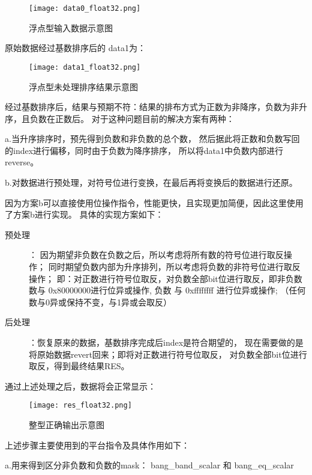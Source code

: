 \begin{figure}[ht]
    \centering
    \texttt{[image: data0\_float32.png]}
    \caption{浮点型输入数据示意图}
    \label{fig:data0}
\end{figure}


原始数据经过基数排序后的 data1为：

\begin{figure}[ht]
    \centering
    \texttt{[image: data1\_float32.png]}
    \caption{浮点型未处理排序结果示意图}
    \label{fig:data1}
\end{figure}


经过基数排序后，结果与预期不符：结果的排布方式为正数为非降序，负数为非升序，且负数在正数后。
对于这种问题目前的解决方案有两种：

a.当升序排序时，预先得到负数和非负数的总个数，
然后据此将正数和负数写回的index进行偏移，同时由于负数为降序排序，
所以将data1中负数内部进行reverse。 

b.对数据进行预处理，对符号位进行变换，在最后再将变换后的数据进行还原。

因为方案b可以直接使用位操作指令，性能更快，且实现更加简便，因此这里使用了方案b进行实现。
具体的实现方案如下：
\begin{description}
\item[预处理]：
因为期望非负数在负数之后，所以考虑将所有数的符号位进行取反操作；
同时期望负数内部为升序排列，所以考虑将负数的非符号位进行取反操作；
即：对正数进行符号位取反，对负数全部bit位进行取反，即非负数数与 0x80000000进行位异或操作, 
负数 与 0xffffffff 进行位异或操作; （任何数与0异或保持不变，与1异或会取反）

\item[后处理]：恢复原来的数据，基数排序完成后index是符合期望的，
现在需要做的是将原始数据revert回来；即将对正数进行符号位取反，
对负数全部bit位进行取反，得到最终结果RES。
\end{description}


通过上述处理之后，数据将会正常显示：

\begin{figure}[ht]
    \centering
    \texttt{[image: res\_float32.png]}
    \caption{整型正确输出示意图}
    \label{fig:res_int32}
\end{figure}


上述步骤主要使用到的平台指令及具体作用如下：

a.用来得到区分非负数和负数的mask： bang\_band\_scalar 和 bang\_eq\_scalar

